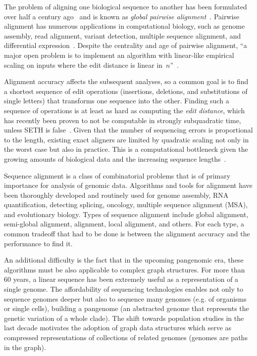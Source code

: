 The problem of aligning one biological sequence to another has been formulated
over half a century ago~\citep{needleman1970general} and is known as
\emph{global pairwise alignment}~\citep{navarro2001guided}. Pairwise alignment
has numerous applications in computational biology, such as genome assembly,
read alignment, variant detection, multiple sequence alignment, and differential
expression~\citep{prjibelski2018sequence}. Despite the centrality and age of
pairwise alignment, ``a major open problem is to implement an algorithm with linear-like
empirical scaling on inputs where the edit distance is linear
in~$n$''~\citep{medvedev2022theoretical}.

Alignment accuracy affects the subsequent analyses, so a common goal
is to find a shortest sequence of edit operations (insertions, deletions, and
substitutions of single letters) that transforms one sequence into the other.
Finding such a sequence of operations is at least as hard as computing the \emph{edit
distance}, which has recently been proven to not be computable in strongly
subquadratic time, unless SETH is false~\citep{backurs2015edit}. Given that
the number of sequencing errors is proportional to the length, existing exact aligners are
limited by quadratic scaling not only in the worst case but also in practice.
This is a computational bottleneck given the growing amounts of biological data
and the increasing sequence lengths~\citep{kucherov2019evolution}.

Sequence alignment is a class of combinatorial problems that is of primary
importance for analysis of genomic data. Algorithms and tools for alignment have
been thoroughly developed and routinely used for genome assembly, RNA
quantification, detecting splicing, oncology, multiple sequence alignment (MSA),
and evolutionary biology. Types of sequence alignment include global alignment,
semi-global alignment, alignment, local alignment, and others. For each type, a
common tradeoff that had to be done is between the alignment accuracy and the
performance to find it.

An additional difficulty is the fact that in the
upcoming pangenomic era, these algorithms must be also applicable to complex
graph structures. For more than 60 years, a linear sequence has been extremely
useful as a representation of a single genome. The affordability of sequencing
technologies enables not only to sequence genomes deeper but also to sequence
many genomes (e.g. of organisms or single cells), building a pangenome (an
abstracted genome that represents the genetic variation of a whole clade). The
shift towards population studies in the last decade motivates the adoption of
graph data structures which serve as compressed representations of collections
of related genomes (genomes are paths in the graph).

